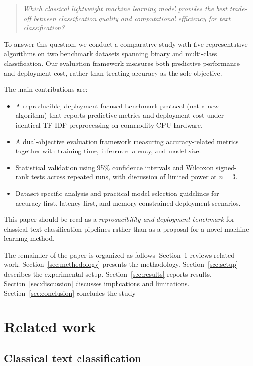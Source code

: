 \documentclass[pdflatex,sn-mathphys-num]{sn-jnl}
\begin{document}
\begin{quote}
\emph{Which classical lightweight machine learning model provides the best trade-off between classification quality and computational efficiency for text classification?}
\end{quote}

To answer this question, we conduct a comparative study with five representative algorithms on two benchmark datasets spanning binary and multi-class classification. Our evaluation framework measures both predictive performance and deployment cost, rather than treating accuracy as the sole objective.

The main contributions are:
\begin{itemize}
    \item A reproducible, deployment-focused benchmark protocol (not a new algorithm) that reports predictive metrics and deployment cost under identical TF-IDF preprocessing on commodity CPU hardware.
    \item A dual-objective evaluation framework measuring accuracy-related metrics together with training time, inference latency, and model size.
    \item Statistical validation using 95\% confidence intervals and Wilcoxon signed-rank tests across repeated runs, with discussion of limited power at $n=3$.
    \item Dataset-specific analysis and practical model-selection guidelines for accuracy-first, latency-first, and memory-constrained deployment scenarios.
\end{itemize}

This paper should be read as a \emph{reproducibility and deployment benchmark} for classical text-classification pipelines rather than as a proposal for a novel machine learning method.

The remainder of the paper is organized as follows. Section~\ref{sec:related} reviews related work. Section~\ref{sec:methodology} presents the methodology. Section~\ref{sec:setup} describes the experimental setup. Section~\ref{sec:results} reports results. Section~\ref{sec:discussion} discusses implications and limitations. Section~\ref{sec:conclusion} concludes the study.

\section{Related work}\label{sec:related}

\subsection{Classical text classification}
\end{document}
